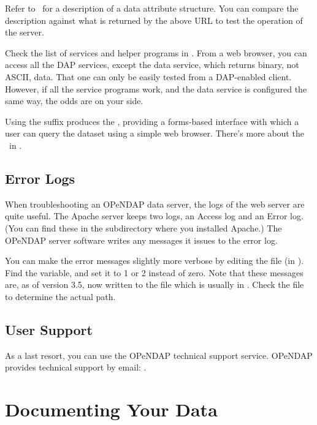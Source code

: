 \documentclass{dods-book}
\begin{document}
Refer to \DODSuser\ for a description of a data attribute structure.
You can compare the description against what is returned by the above
URL to test the operation of the server.

Check the list of services and helper programs in
. From a web browser, you can access
all the DAP services, except the data service, which returns binary,
not ASCII, data. That one can only be easily tested from a DAP-enabled
client. However, if all the service programs work, and the data
service is configured the same way, the odds are on your side.

Using the  suffix produces the \ind{\ifh}, providing a
forms-based interface with which a user can query the dataset using a
simple web browser.  There's more about the \ifh\ in \DODSuser .

\section{Error Logs}

 When troubleshooting an OPeNDAP data
server, the logs of the web server are quite useful. The Apache server
keeps two logs, an Access log and an Error log. (You can find these in
the  subdirectory where you installed Apache.) The OPeNDAP
server software writes any messages it issues to the error log.

You can make the error messages slightly more verbose by editing the
 file (in ). Find
the  variable, and set it to 1 or 2 instead of zero. Note
that these messages are, as of version 3.5, now written to the
 file which is usually in .
Check the  file to determine the actual path.

\section{User Support}

 As a last resort, you can use
the OPeNDAP technical support service. OPeNDAP provides technical
support by email: \DODSsupport.

\chapter{Documenting Your Data}
\label{sec,document-data}
\end{document}
